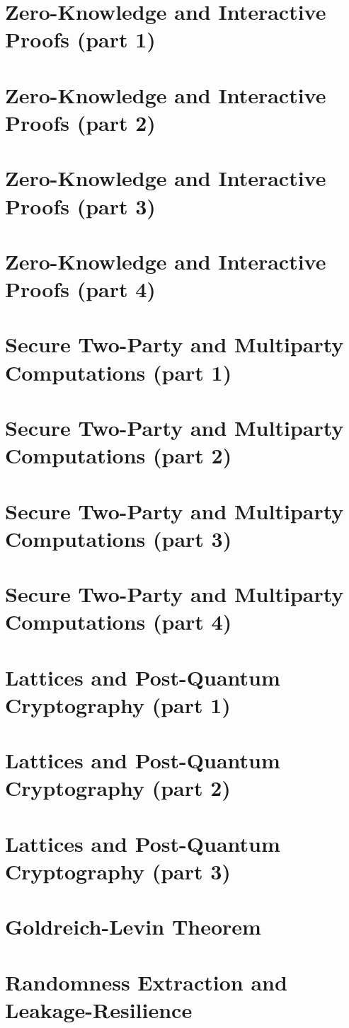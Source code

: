 \documentclass{llncs}
\begin{document}
\section{Zero-Knowledge and Interactive Proofs (part 1)}

\section{Zero-Knowledge and Interactive Proofs (part 2)}

\section{Zero-Knowledge and Interactive Proofs (part 3)}

\section{Zero-Knowledge and Interactive Proofs (part 4)}

\section{Secure Two-Party and Multiparty Computations (part 1)}

\section{Secure Two-Party and Multiparty Computations (part 2)}

\section{Secure Two-Party and Multiparty Computations (part 3)}

\section{Secure Two-Party and Multiparty Computations (part 4)}

\section{Lattices and Post-Quantum Cryptography (part 1)}

\section{Lattices and Post-Quantum Cryptography (part 2)}

\section{Lattices and Post-Quantum Cryptography (part 3)}

\section{Goldreich-Levin Theorem}

\section{Randomness Extraction and Leakage-Resilience}


\printbibliography %
\end{document}
